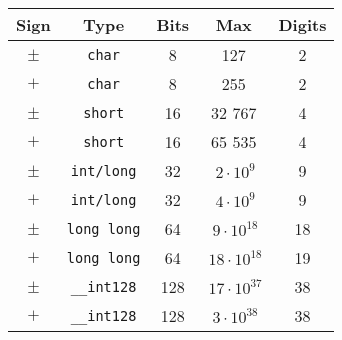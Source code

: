 \documentclass[12pt, a4paper, twoside]{article}
\begin{document}
\begin{center}
\begin{tabular}{||c c c c c||}
 \hline
  Sign & Type & Bits & Max & Digits \\ [0.5ex]
  \hline\hline
  $\pm$ & \texttt{char} & 8 & 127 & 2 \\
  \hline
  $+$ & \texttt{char} & 8 & 255 & 2 \\
  \hline
  $\pm$ & \texttt{short} & 16 & 32 767 & 4 \\
  \hline
  $+$ & \texttt{short} & 16 & 65 535 & 4 \\
  \hline
  $\pm$ & \texttt{int/long} & 32 & $~2\cdot10^9$ & 9 \\
  \hline
  $+$ & \texttt{int/long} & 32 & $~4\cdot10^9$ & 9 \\
  \hline
  $\pm$ & \texttt{long long} & 64 & $~9\cdot10^{18}$ & 18 \\
  \hline
  $+$ & \texttt{long long} & 64 & $~18\cdot10^{18}$ & 19 \\
  \hline
  $\pm$ & \texttt{\_\_int128} & 128 & $~17\cdot10^{37}$ & 38 \\
  \hline
  $+$ & \texttt{\_\_int128} & 128 & $~3\cdot10^{38}$ & 38 \\ [1ex]
  \hline
\end{tabular}
\end{center}
\end{document}
